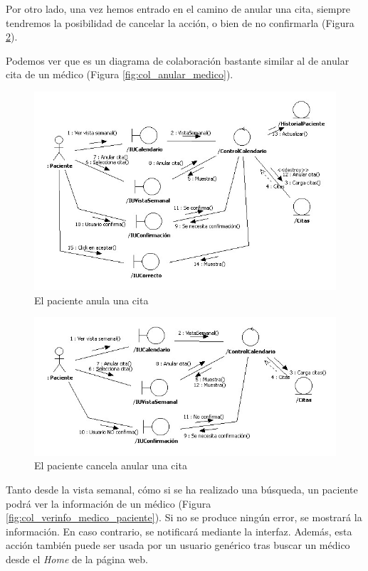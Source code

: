 \documentclass[a4paper,oneside,11pt]{book}
\begin{document}
			Por otro lado, una vez hemos entrado en el camino de anular una cita, siempre tendremos la posibilidad de cancelar la acción, o bien de no confirmarla (Figura \ref{fig:col_anularcita_paciente_cancelar}).
			
			Podemos ver que es un diagrama de colaboración bastante similar al de anular cita de un médico (Figura \ref{fig:col_anular_medico}).
			
			\begin{figure}[H]
			  \centering
			    \includegraphics[width=16cm]{img/jpg/colaboraciones/26_AnularCitaPaciente.jpg}
			  \caption{El paciente anula una cita}
			  \label{fig:col_anulacita_paciente}
			\end{figure}
			
			\begin{figure}[H]
			  \centering
			    \includegraphics[width=16cm]{img/jpg/colaboraciones/27_AnularCitaPacienteCancelar.jpg}
			  \caption{El paciente cancela anular una cita}
			  \label{fig:col_anularcita_paciente_cancelar}
			\end{figure}
			
			Tanto desde la vista semanal, cómo si se ha realizado una búsqueda, un paciente podrá ver la información de un médico (Figura \ref{fig:col_verinfo_medico_paciente}). Si no se produce ningún error, se mostrará la información. En caso contrario, se notificará mediante la interfaz. Además, esta acción también puede ser usada por un usuario genérico tras buscar un médico desde el \textit{Home} de la página web.
			
\end{document}
